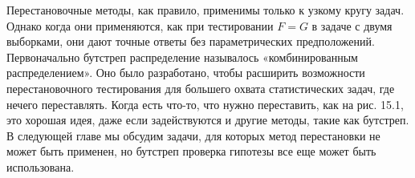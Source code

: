 Перестановочные методы, как правило, применимы только к узкому кругу задач. Однако когда они применяются, как при тестировании $F = G$ в задаче с двумя выборками, они дают точные ответы без параметрических предположений. Первоначально бутстреп распределение называлось «комбинированным распределением». Оно было разработано, чтобы расширить возможности перестановочного тестирования для большего охвата статистических задач, где нечего переставлять. Когда есть что-то, что нужно переставить, как на рис. 15.1, это хорошая идея, даже если задействуются и другие методы, такие как бутстреп. В следующей главе мы обсудим задачи, для которых метод перестановки не может быть применен, но бутстреп проверка гипотезы все еще может быть использована.